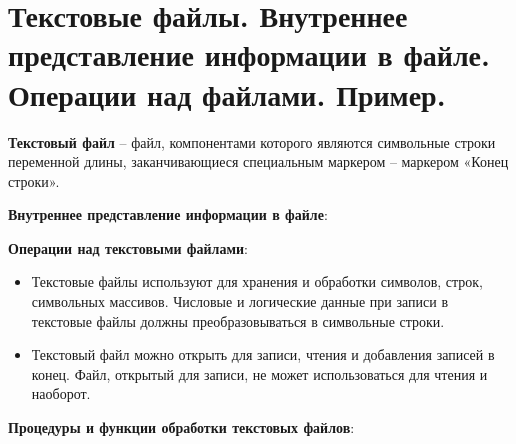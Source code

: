 


\newpage\section{Текстовые  файлы.  Внутреннее  представление  информации  в  файле.  Операции  над  файлами. Пример. }

\begin{myquote}
            
\end{myquote}


{\bf {Текстовый файл}} – файл, компонентами которого являются символьные строки переменной длины, заканчивающиеся специальным маркером – маркером «Конец строки». 
 
{\bf {Внутреннее представление информации в файле}}:

{\bf {Операции над текстовыми файлами}}:
\begin{itemize}
\item Текстовые файлы используют для хранения и обработки символов, строк, символьных массивов. Числовые и логические данные при записи в текстовые файлы должны преобразовываться в символьные строки.
\item Текстовый файл можно открыть для записи, чтения и добавления записей в конец. Файл, открытый для записи, не может использоваться для чтения и наоборот. 
\end{itemize}

{\bf {Процедуры и функции обработки текстовых файлов}}: 

